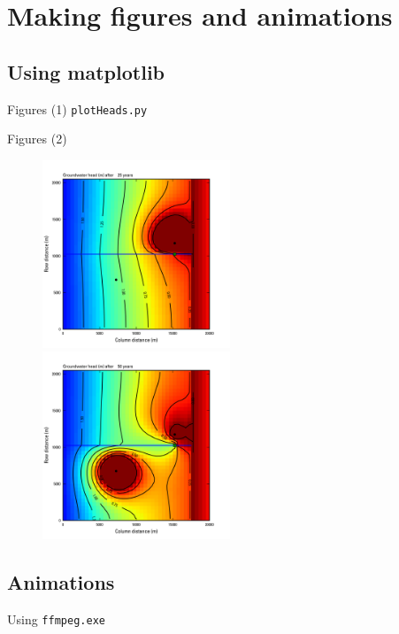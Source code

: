 \documentclass[t]{beamer}
\begin{document}
\section{Making figures and animations}
\subsection{Using matplotlib}
\begin{frame}{Figures (1)}
\small{\texttt{plotHeads.py}}
  \begin{figure}[ht]
  \centering
        \lstset{numbers=left}
        
   \end{figure}
\end{frame}

\begin{frame}{Figures (2)}
  \begin{figure}[ht]
  \centering
       \includegraphics[width=0.5\textwidth]{figures/MF_Results_00024.png} 
       \includegraphics[width=0.5\textwidth]{figures/MF_Results_00049.png}
   \end{figure}
\end{frame}


\subsection{Animations}
\begin{frame}{Using \texttt{ffmpeg.exe}}
  \begin{figure}[ht]
  \centering
        \lstset{numbers=left}
        
   \end{figure}
\end{frame}
\end{document}
